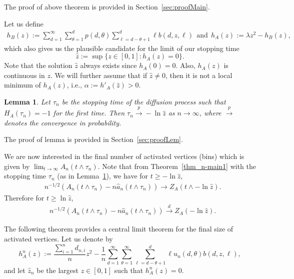 \documentclass[11pt]{article}
\newtheorem{lemma}[theorem]{Lemma}
\def\tod{\stackrel{d}{\longrightarrow}}
\def\top{\stackrel{p}{\longrightarrow}}
\def\tod{\stackrel{d}{\longrightarrow}}
\def\top{\stackrel{p}{\longrightarrow}}
\begin{document}
\medskip

The proof of above theorem is provided in Section~\ref{sec:proofMain}. 

\medskip

Let us define 
\begin{align*}
h_B(z) :=\sum_{d=1}^{\infty}\sum_{\theta=1}^{d} p(d,\theta) \sum_{\ell=d-\theta+1}^d \ell b(d,z,\ell) \ \ \text{and} \ \ h_A(z):=\lambda  z^2 - h_B(z),
\end{align*}
which also gives us the plausible candidate for the limit of our stopping time
\begin{equation*}
\widehat{z} :=\sup\{z\in [0,1]:  h_A(z)=0 \}.
\end{equation*}
Note that the solution $\widehat{z}$ always exists since $h_A(0)=0$. Also, $h_A(z)$ is continuous in $z$. We will further assume that if $\widehat{z}\neq 0$, then it is not a local minimum of $h_A(z)$, i.e., $\alpha:=h'_A(\widehat{z})>0$.

\begin{lemma}\label{lem:stop}
Let $\tau_n$ be the stopping time of the diffusion process such that $H_A(\tau_n) = -1$ for the first time.
Then $\tau_n \top -\ln \widehat{z}$ as $n\rightarrow \infty$, where $\top$ denotes the convergence in probability.
\end{lemma}

The proof of lemma is provided in Section~\ref{sec:proofLem}. 

\medskip

We are now interested in the final number of activated vertices (bins) which is given by $\lim_{t \rightarrow \infty}A_n(t \wedge \tau_n)$. Note that from Theorem~\ref{thm_n-main1} with the stopping time $\tau_n$ (as in Lemma~\ref{lem:stop}), we have for $t\geq -\ln{\widehat{z}}$,
\begin{align*}
&n^{-1/2}\left(A_n(t \wedge \tau_n)-n\widehat{a}_n(t \wedge \tau_n)\right) \rightarrow Z_{A}(t \wedge -\ln{\widehat{z}}).
\end{align*}
Therefore for $t\geq \ln{\widehat{z}}$,
\begin{align*}
&n^{-1/2}\left(A_n(t \wedge \tau_n)-n\widehat{a}_n(t \wedge \tau_n)\right) \tod Z_{A}(-\ln{\widehat{z}}).
\end{align*}

The following theorem provides a central limit theorem for the final size of activated vertices. Let us denote by
$$
h_A^n(z) :=  \frac{\sum_{i=1}^n d_{n,i}}{n}z^2-\frac{1}{n}\sum_{d=1}^{\infty}\sum_{\theta=1}^{\infty}\sum_{\ell=d-\theta+1}^{d}\ell u_n(d,\theta) b(d,z,\ell),
$$
and let $\widehat{z}_n$ be the largest $z\in[0,1]$ such that $h_A^n(z)=0$.
\end{document}
